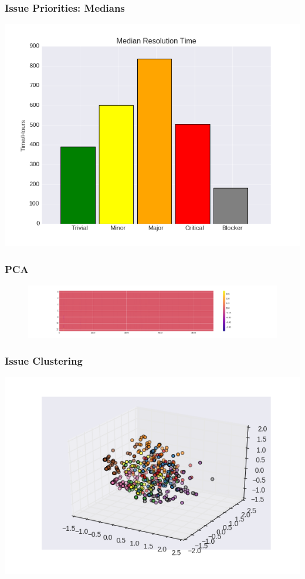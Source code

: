 \documentclass{beamer}
\begin{document}
\begin{frame}\frametitle{Issue Priorities: Medians}
\centering
\includegraphics[width=\textwidth]{./median_resolution_time.png}
\end{frame}


\begin{frame}\frametitle{PCA}
\thispagestyle{empty}
\begin{figure}
\hspace{-3cm}
\includegraphics[width=1.5\textwidth]{./pca_components.png}
\end{figure}
\end{frame}


\begin{frame}\frametitle{Issue Clustering}
\centering
\includegraphics[width=\textwidth]{./clustering.png}
\end{frame}
\end{document}
